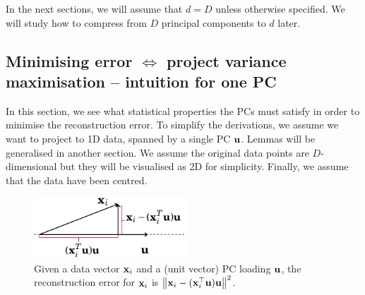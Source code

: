 \documentclass[a4paper]{article}
\begin{document}
 \begin{mynote}
In the next sections, we will assume that $d=D$ unless otherwise specified. We will study how to compress from $D$ principal components to $d$ later.
\end{mynote}
 
 
 
 
 
\subsection{Minimising error $\Leftrightarrow$ project variance maximisation -- intuition for one PC}


In this section, we see what statistical properties the PCs must satisfy in order to minimise the reconstruction error. To simplify the derivations, we assume we want to project to 1D data, spanned by a single PC $\textbf{u}$. Lemmas will be generalised in another section. We assume the original data points are $D$-dimensional but they will be visualised as 2D for simplicity. Finally, we assume that the data have been centred.



\begin{figure}[H]
    \centering
    \includegraphics[height=2.3cm]{img/recon_error_for_vector.png}
    \captionsetup{width=.55\linewidth}
    \caption{Given a data vector $\textbf{x}_i$ and a (unit vector) PC loading $\textbf{u}$, the reconstruction error for $\textbf{x}_i$ is $\left\lVert\textbf{x}_i - (\textbf{x}_i^{\top}\textbf{u})\textbf{u}\right\rVert^2$.}
\end{figure}
\end{document}
